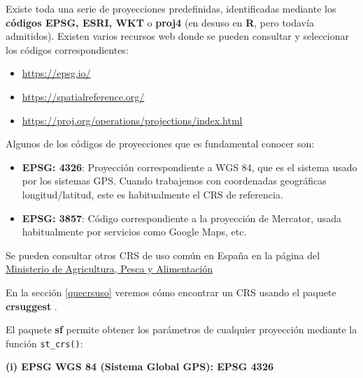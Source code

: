 \documentclass[
]{book}
\theoremstyle{definition}
\theoremstyle{definition}
\theoremstyle{definition}
\theoremstyle{definition}
\theoremstyle{remark}
\begin{document}
Existe toda una serie de proyecciones predefinidas, identificadas mediante los
\textbf{códigos EPSG, ESRI, WKT} o \textbf{proj4} (en desuso en \textbf{R}, pero todavía
admitidos). Existen varios recursos web donde se pueden consultar y seleccionar
los códigos correspondientes:

\begin{itemize}
\item
  \url{https://epsg.io/}
\item
  \url{https://spatialreference.org/}
\item
  \url{https://proj.org/operations/projections/index.html}
\end{itemize}

Algunos de los códigos de proyecciones que es fundamental conocer son:

\begin{itemize}
\item
  \textbf{EPSG: 4326}: Proyección correspondiente a WGS 84, que es el sistema usado
  por los sistemas GPS. Cuando trabajemos con coordenadas geográficas
  longitud/latitud, este es habitualmente el CRS de referencia.
\item
  \textbf{EPSG: 3857}: Código correspondiente a la proyección de Mercator, usada
  habitualmente por servicios como Google Maps, etc.
\end{itemize}

Se pueden consultar otros CRS de uso común en España en la página del
\href{https://www.mapa.gob.es/es/cartografia-y-sig/ide/directorio_datos_servicios/caracteristicas_wms.aspx}{Ministerio de Agricultura, Pesca y
Alimentación}

En la sección \ref{quecrsuso} veremos cómo encontrar un CRS usando el paquete
\textbf{crsuggest} \citep{R-crsuggest}.

El paquete \textbf{sf} \citep{R-sf}permite obtener los parámetros de cualquier proyección
mediante la función \texttt{st\_crs()}:

\textbf{(i) EPSG WGS 84 (Sistema Global GPS): EPSG 4326}
\end{document}

